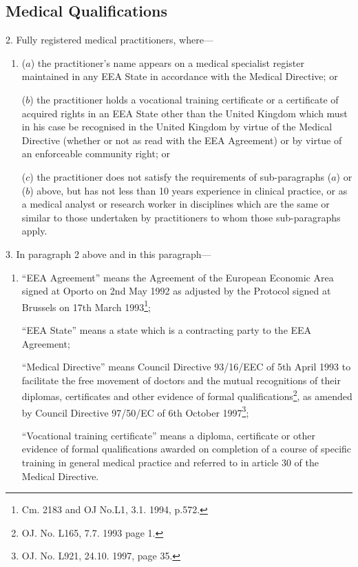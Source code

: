 \documentclass[12pt,a4paper]{article}
\begin{document}
\subsection*{Medical Qualifications}

2.  Fully registered medical practitioners, where—
\begin{enumerate}\item[]
($a$) the practitioner’s name appears on a medical specialist register maintained in any EEA State in accordance with the Medical Directive; or

($b$) the practitioner holds a vocational training certificate or a certificate of acquired rights in an EEA State other than the United Kingdom which must in his case be recognised in the United Kingdom by virtue of the Medical Directive (whether or not as read with the EEA Agreement) or by virtue of an enforceable community right; or

($c$) the practitioner does not satisfy the requirements of sub-paragraphs ($a$) or ($b$) above, but has not less than 10 years experience in clinical practice, or as a medical analyst or research worker in disciplines which are the same or similar to those undertaken by practitioners to whom those sub-paragraphs apply.
\end{enumerate}

\medskip

3.  In paragraph 2 above and in this paragraph—
\begin{enumerate}\item[]
“EEA Agreement” means the Agreement of the European Economic Area signed at Oporto on 2nd May 1992 as adjusted by the Protocol signed at Brussels on 17th March 1993\footnote{\frenchspacing Cm. 2183 and OJ No.L1, 3.1. 1994, p.572.};

“EEA State” means a state which is a contracting party to the EEA Agreement;

“Medical Directive” means Council Directive 93/16/EEC of 5th April 1993 to facilitate the free movement of doctors and the mutual recognitions of their diplomas, certificates and other evidence of formal qualifications\footnote{\frenchspacing OJ. No. L165, 7.7. 1993 page 1.}, as amended by Council Directive 97/50/EC of 6th October 1997\footnote{\frenchspacing OJ. No. L921, 24.10. 1997, page 35.};

“Vocational training certificate” means a diploma, certificate or other evidence of formal qualifications awarded on completion of a course of specific training in general medical practice and referred to in article 30 of the Medical Directive.
\end{enumerate}
\end{document}
